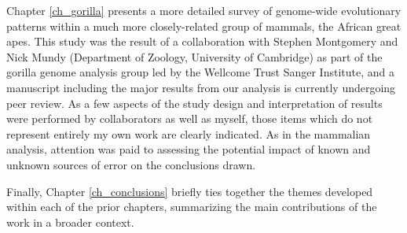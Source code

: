 Chapter \ref{ch_gorilla} presents a more detailed survey of
genome-wide evolutionary patterns within a much more closely-related
group of mammals, the African great apes. This study was the result of
a collaboration with Stephen Montgomery and Nick Mundy (Department of
Zoology, University of Cambridge) as part of the gorilla genome
analysis group led by the Wellcome Trust Sanger Institute, and a
manuscript including the major results from our analysis is currently
undergoing peer review. As a few aspects of the study design and
interpretation of results were performed by collaborators as well as
myself, those items which do not represent entirely my own work are
clearly indicated. As in the mammalian analysis, attention was paid to
assessing the potential impact of known and unknown sources of error
on the conclusions drawn.

Finally, Chapter \ref{ch_conclusions} briefly ties together the themes
developed within each of the prior chapters, summarizing the main
contributions of the work in a broader context.
